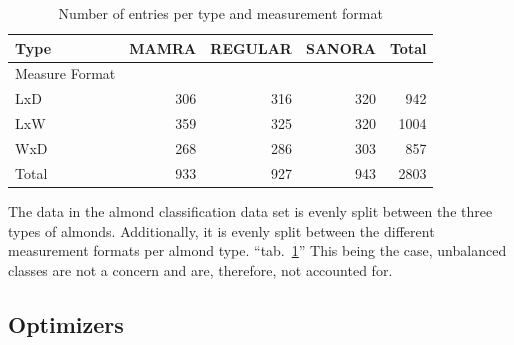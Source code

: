\documentclass[conference]{IEEEtran}
\begin{document}
\begin{table}[h]
    \centering
    \begin{tabular}{lrrrr}
        \hline
        Type            & MAMRA & REGULAR & SANORA & Total \\
        \hline
        Measure Format  &       &         &        &       \\
        LxD             & 306   & 316     & 320    & 942   \\
        LxW             & 359   & 325     & 320    & 1004  \\
        WxD             & 268   & 286     & 303    & 857   \\
        Total           & 933   & 927     & 943    & 2803  \\
        \hline
    \end{tabular}
    \caption{Number of entries per type and measurement format}
    \label{tab:DataBalance1}
\end{table}

The data in the almond classification data set is evenly split between the three types of almonds. Additionally, it is evenly split between the different measurement formats per almond type. ``tab.~\ref{tab:DataBalance1}'' This being the case, unbalanced classes are not a concern and are, therefore, not accounted for. 

\subsection{Optimizers}
\end{document}

